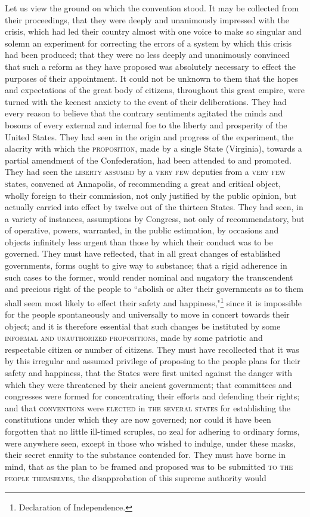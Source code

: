Let us view the ground on which the convention stood. It may be collected from their proceedings, that they were deeply and unanimously impressed with the crisis, which had led their country almost with one voice to make so singular and solemn an experiment for correcting the errors of a system by which this crisis had been produced; that they were no less deeply and unanimously convinced that such a reform as they have proposed was absolutely necessary to effect the purposes of their appointment. It could not be unknown to them that the hopes and expectations of the great body of citizens, throughout this great empire, were turned with the keenest anxiety to the event of their deliberations. They had every reason to believe that the contrary sentiments agitated the minds and bosoms of every external and internal foe to the liberty and prosperity of the United States. They had seen in the origin and progress of the experiment, the alacrity with which the \textsc{proposition}, made by a single State (Virginia), towards a partial amendment of the Confederation, had been attended to and promoted. They had seen the \textsc{liberty assumed }by a \textsc{very few }deputies from a \textsc{very few s}tates, convened at Annapolis, of recommending a great and critical object, wholly foreign to their commission, not only justified by the public opinion, but actually carried into effect by twelve out of the thirteen States. They had seen, in a variety of instances, assumptions by Congress, not only of recommendatory, but of operative, powers, warranted, in the public estimation, by occasions and objects infinitely less urgent than those by which their conduct was to be governed. They must have reflected, that in all great changes of established governments, forms ought to give way to substance; that a rigid adherence in such cases to the former, would render nominal and nugatory the transcendent and precious right of the people to ``abolish or alter their governments as to them shall seem most likely to effect their safety and happiness,"\footnote{Declaration of Independence.} since it is impossible for the people spontaneously and universally to move in concert towards their object; and it is therefore essential that such changes be instituted by some \textsc{informal and unauthorized propositions}, made by some patriotic and respectable citizen or number of citizens. They must have recollected that it was by this irregular and assumed privilege of proposing to the people plans for their safety and happiness, that the States were first united against the danger with which they were threatened by their ancient government; that committees and congresses were formed for concentrating their efforts and defending their rights; and that \textsc{conventions }were \textsc{elected }in \textsc{the several states }for establishing the constitutions under which they are now governed; nor could it have been forgotten that no little ill-timed scruples, no zeal for adhering to ordinary forms, were anywhere seen, except in those who wished to indulge, under these masks, their secret enmity to the substance contended for. They must have borne in mind, that as the plan to be framed and proposed was to be submitted \textsc{to the people themselves}, the disapprobation of this supreme authority would 
